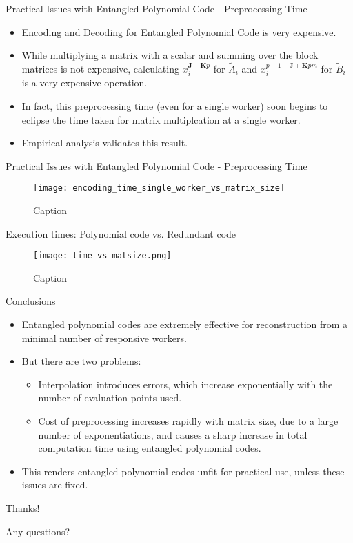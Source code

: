\documentclass{beamer}
\begin{document}
\begin{frame}{Practical Issues with Entangled Polynomial Code - Preprocessing Time}
    \begin{itemize}
        \item Encoding and Decoding for Entangled Polynomial Code is very expensive.
        \item While multiplying a matrix with a scalar and summing over the block matrices is not expensive, calculating $x_{i}^{\mathbf{J} + \mathbf{K}p}$ for $\tilde{A}_{i}$ and $x_{i}^{p-1-\mathbf{J}+\mathbf{K}pm}$ for $\tilde{B}_{i}$ is a very expensive operation.
        \item In fact, this preprocessing time (even for a single worker) soon begins to eclipse the time taken for matrix multiplcation at a single worker.
        \item Empirical analysis validates this result.
    \end{itemize}
\end{frame}

\begin{frame}{Practical Issues with Entangled Polynomial Code - Preprocessing Time}
    \begin{figure}[H]
        \centering
        \texttt{[image: encoding\_time\_single\_worker\_vs\_matrix\_size]}
        \caption{Caption}
    \end{figure}
\end{frame}

\begin{frame}{Execution times: Polynomial code vs. Redundant code}
    \begin{figure}[H]
        \centering
        \texttt{[image: time\_vs\_matsize.png]}
        \caption{Caption}
    \end{figure}
\end{frame}

\begin{frame}{Conclusions}
    \begin{itemize}
        \item Entangled polynomial codes are extremely effective for reconstruction from a minimal number of responsive workers.
        \item But there are two problems:
        \begin{itemize}
            \item Interpolation introduces errors, which increase exponentially with the number of evaluation points used.
            \item Cost of preprocessing increases rapidly with matrix size, due to a large number of exponentiations, and causes a sharp increase in total computation time using entangled polynomial codes.
        \end{itemize}
        \item This renders entangled polynomial codes unfit for practical use, unless these issues are fixed.
    \end{itemize}
\end{frame}

\begin{frame}{}
    \Large{Thanks!}

    \bigskip

    \normalsize{Any questions?}
\end{frame}
\end{document}

